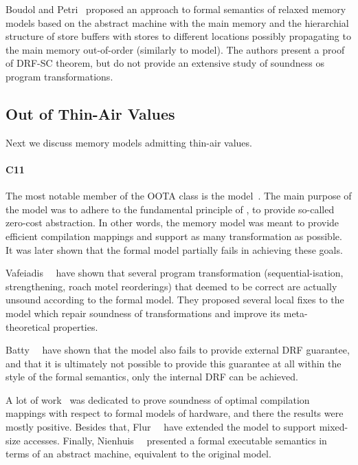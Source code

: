 Boudol and Petri~\cite{Boudol-Petri:POPL09} proposed 
an approach to formal semantics of relaxed memory models 
based on the abstract machine with the main memory 
and the hierarchial structure of store buffers 
with stores to different locations possibly 
propagating to the main memory out-of-order
(similarly to \PSO model).
The authors present a proof of DRF-SC theorem,
but do not provide an extensive study 
of soundness os program transformations.

\subsection{Out of Thin-Air Values}

Next we discuss memory models admitting thin-air values. 

\paragraph{C11}

The most notable member of the OOTA class is the \CMM model~\cite{Batty-al:POPL11}.
The main purpose of the \CMM model was to adhere to the fundamental principle of \CPP, 
\ie to provide so-called zero-cost abstraction. 
In other words, the memory model was meant to provide 
efficient compilation mappings and support as many transformation as possible.
It was later shown that the formal model partially fails in achieving these goals.

Vafeiadis~\etal~\cite{Vafeiadis-al:POPL15} have shown
that several program transformation 
(sequential-isation, strengthening, roach motel reorderings) 
that deemed to be correct are actually unsound according to the formal model.
They proposed several local fixes to the model which 
repair soundness of transformations and improve 
its meta-theoretical properties. 

Batty~\etal~\cite{Batty-al:ESOP15} have shown that 
the model also fails to provide external DRF guarantee, 
and that it is ultimately not possible to provide this guarantee
at all within the style of the \CMM formal semantics,
only the internal DRF can be achieved. 

A lot of work~\cite{Batty-al:POPL11, Sarkar-al:PLDI12, Batty-al:POPL12, Batty-al:POPL16} 
was dedicated to prove soundness of optimal compilation mappings 
with respect to formal models of hardware, 
and there the results were mostly positive.
Besides that, Flur~\etal~\cite{Flur-al:POPL17} have extended the model to support mixed-size accesses.
Finally, Nienhuis~\etal~\cite{Nienhuis-al:OOPSLA16} presented 
a formal executable semantics in terms of an abstract machine, 
equivalent to the original \CMM model. 

